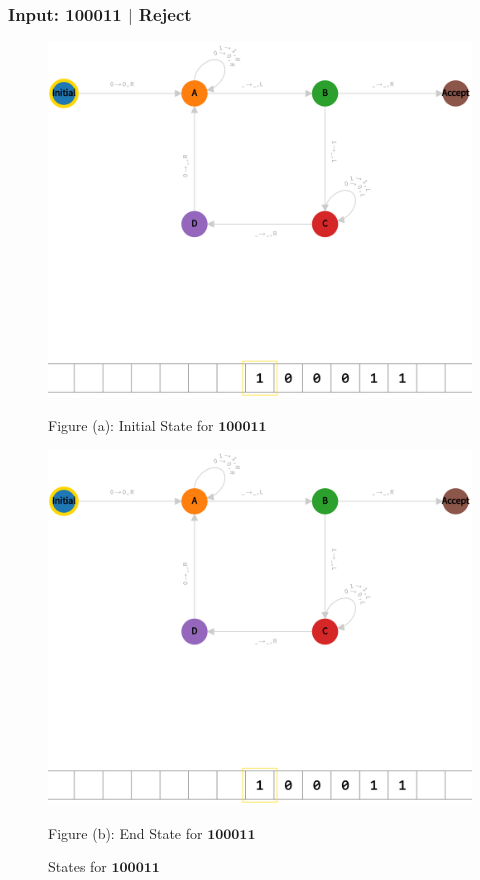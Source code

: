 \subsubsection*{Input: 100011 $|$ Reject}
\label{q1-100011}

\begin{figure}[ht]
  \centering
  \begin{minipage}{.49\linewidth}
    \centering
    \includegraphics[width=\linewidth]{answers/img/q1-100011-initial.png}
    \caption*{Figure (a): Initial State for $\mathbf{100011}$}
    \label{fig:100011-initial}
  \end{minipage}
  \begin{minipage}{.49\linewidth}
    \centering
    \includegraphics[width=\linewidth]{answers/img/q1-100011-end.png}
    \caption*{Figure (b): End State for $\mathbf{100011}$}
    \label{fig:100011-end}
  \end{minipage}
  \caption{States for $\mathbf{100011}$}
  \label{fig:in-100011}
\end{figure}

\vspace*{\fill}

